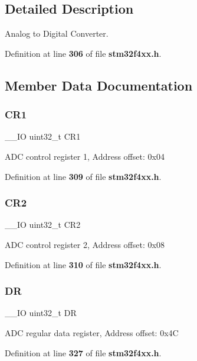 \subsection{Detailed Description}
Analog to Digital Converter. 

Definition at line \textbf{ 306} of file \textbf{ stm32f4xx.\+h}.



\subsection{Member Data Documentation}
\mbox{\label{structADC__TypeDef_ab0ec7102960640751d44e92ddac994f0}} 
\subsubsection{C\+R1}
{\footnotesize\ttfamily \+\_\+\+\_\+\+IO uint32\+\_\+t C\+R1}

A\+DC control register 1, Address offset\+: 0x04 

Definition at line \textbf{ 309} of file \textbf{ stm32f4xx.\+h}.

\mbox{\label{structADC__TypeDef_afdfa307571967afb1d97943e982b6586}} 
\subsubsection{C\+R2}
{\footnotesize\ttfamily \+\_\+\+\_\+\+IO uint32\+\_\+t C\+R2}

A\+DC control register 2, Address offset\+: 0x08 

Definition at line \textbf{ 310} of file \textbf{ stm32f4xx.\+h}.

\mbox{\label{structADC__TypeDef_a3df0d8dfcd1ec958659ffe21eb64fa94}} 
\subsubsection{DR}
{\footnotesize\ttfamily \+\_\+\+\_\+\+IO uint32\+\_\+t DR}

A\+DC regular data register, Address offset\+: 0x4C 

Definition at line \textbf{ 327} of file \textbf{ stm32f4xx.\+h}.

